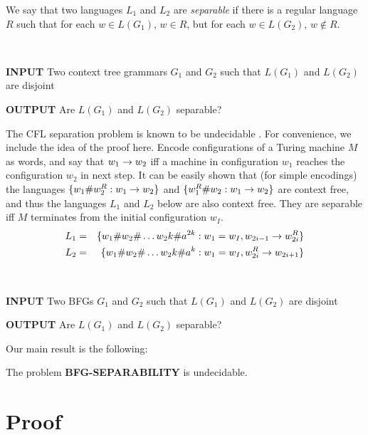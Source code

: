 \documentclass{article}
\begin{document}
\begin{definition}
We say that two languages $L_1$ and $L_2$ are \emph{separable} if there is a 
regular language $R$ such that for each $w \in L(G_1)$, $w \in R$,
but for each $w \in L(G_2)$, $w \notin R$.
\end{definition}

\begin{problem} \label{cflsep} {\ }

{\bf INPUT} Two context tree grammars $G_1$ and $G_2$ such that $L(G_1)$ and $L(G_2)$
are disjoint

{\bf OUTPUT} Are $L(G_1)$ and $L(G_2)$ separable?
\end{problem}

The CFL separation problem is known to be undecidable \cite{hunt, szymanski}. For
convenience, we include the idea of the proof here. Encode configurations of a 
Turing machine $M$ as words, and say that $w_1 \rightarrow w_2$ iff a machine
in configuration $w_1$ reaches the configuration $w_2$ in next step. It can be
easily shown 
that (for simple encodings)
the languages $\{w_1 \# w_2^R: w_1 \rightarrow w_2\}$ and $\{w_1^R \# w_2: w_1 \rightarrow w_2\}$
are context free, and thus the languages $L_1$ and $L_2$ below are also context free.
They are separable iff $M$ terminates from the initial configuration $w_I$.
\begin{eqnarray*}
L_1 &=& \{w_1 \# w_2 \# \ldots w_2k \# a^{2k} : w_1 = w_I, w_{2i-1} \rightarrow w_{2i}^R \} \\
L_2 &=& \{w_1 \# w_2 \# \ldots w_2k \# a^{k} : w_1 = w_I, w^R_{2i} \rightarrow w_{2i+1} \}
\end{eqnarray*}

\begin{problem} \label{flattensep} {\ }

{\bf INPUT} Two BFGs $G_1$ and $G_2$ such that $L(G_1)$ and $L(G_2)$ are disjoint

{\bf OUTPUT} Are $L(G_1)$ and $L(G_2)$ separable?
\end{problem}

Our main result is the following:

\begin{theorem} \label{tflattensep}
The problem {\bf BFG-SEPARABILITY} is undecidable.
\end{theorem}

\section{Proof}
\end{document}
